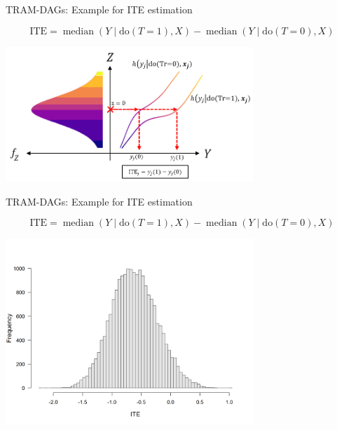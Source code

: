 \documentclass[onlytextwidth,english]{beamer}\usepackage[]{graphicx}\usepackage[]{xcolor}
\begin{document}
\begin{frame}{TRAM-DAGs: Example for ITE estimation}

\[
\text{ITE} = \operatorname{median}(Y \mid \text{do}(T = 1), X) - \operatorname{median}(Y \mid \text{do}(T = 0), X)
\]

\centering

\includegraphics[width=0.7\textwidth]{img/potential_outcomes_y.png}



\end{frame}





\begin{frame}{TRAM-DAGs: Example for ITE estimation}

\[
\text{ITE} = \operatorname{median}(Y \mid \text{do}(T = 1), X) - \operatorname{median}(Y \mid \text{do}(T = 0), X)
\]

\centering
\includegraphics[width=0.7\textwidth]{img/observ_scenario1_ite_distribution_dgp.png}

\end{frame}
\end{document}
